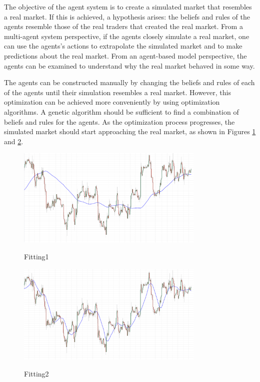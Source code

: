\documentclass[review]{elsarticle}
\begin{document}
The objective of the agent system is to create a simulated market that resembles
a real market. If this is achieved, a hypothesis arises: the beliefs and rules
of the agents resemble those of the real traders that created the real
market. From a multi-agent system perspective, if the agents closely simulate a
real market, one can use the agents's actions to extrapolate the simulated
market and to make predictions about the real market. From an agent-based model
perspective, the agents can be examined to understand why the real market
behaved in some way.

The agents can be constructed manually by changing the beliefs and rules of each
of the agents until their simulation resembles a real market. However, this
optimization can be achieved more conveniently by using optimization
algorithms. A genetic algorithm should be sufficient to find a combination of
beliefs and rules for the agents. As the optimization process progresses, the
simulated market should start approaching the real market, as shown in Figures
\ref{figure:fitting1} and \ref{figure:fitting2}.

\begin{figure}
\caption{Fitting1}
\centering
\includegraphics[width=0.8\textwidth]{img/fitting1.png}
\label{figure:fitting1}
\end{figure}

\begin{figure}
\caption{Fitting2}
\centering
\includegraphics[width=0.8\textwidth]{img/fitting2.png}
\label{figure:fitting2}
\end{figure}
\end{document}
